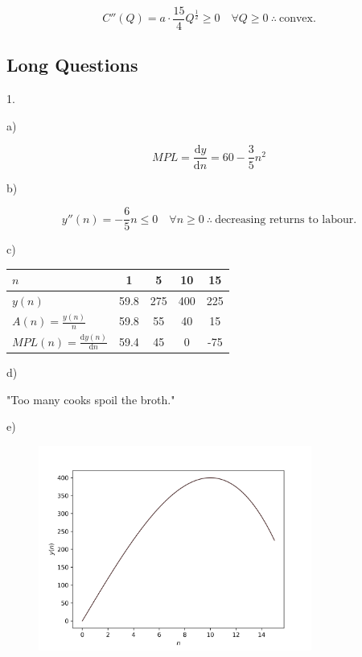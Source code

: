\documentclass{article}
\newcommand{\dd}[1]{\mathrm{d}#1}
\begin{document}
$$
  C''(Q) = a\cdot\frac{15}{4}Q^{\frac{1}{2}} \geq 0 \quad \forall Q \geq 0 \: \therefore \: \text{convex}.
$$

\clearpage

\subsection{Long Questions}

\noindent

1.

a)

$$
  MPL = \frac{\dd y}{\dd n} = 60 - \frac{3}{5}n^2
$$

b)

$$
  y''(n) = -\frac{6}{5}n \leq 0 \quad \forall n \geq 0 \: \therefore \: \text{decreasing returns to labour.}
$$

c)

\begin{center}
  \begin{tabular}{l| c c c c}
    $n$ & 1 & 5 & 10 & 15 \\
    \hline
    $y(n)$ & 59.8 & 275 & 400 & 225 \\
    $A(n) = \frac{y(n)}{n}$ & 59.8 & 55 & 40 & 15 \\
    $MPL(n) = \frac{\dd y(n)}{\dd n}$ & 59.4 & 45 & 0 & -75
  \end{tabular}
\end{center}

d)

"Too many cooks spoil the broth."

e)

\begin{figure}[H]
  \centering
  \includegraphics[width=0.8\textwidth]{figures/5_Differentiation/LQ1e.png}
\end{figure}
\end{document}
